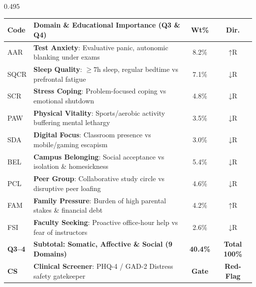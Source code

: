 \documentclass[aspectratio=169, 10pt]{beamer}
\begin{document}
\begin{frame}
\begin{columns}[T]
    \begin{column}{0.495\textwidth}
      \begin{tcolorbox}[colback=white, colframe=BluePrimary, arc=1.5mm, boxrule=0.8pt, top=0.3mm, bottom=0.3mm, left=0.8mm, right=0.8mm]
        \centering\fontsize{4.7pt}{5.6pt}\selectfont
        \renewcommand{\arraystretch}{0.84}
        \begin{tabularx}{\linewidth}{@{}l X c c@{}}
          \toprule
          \textbf{Code} & \textbf{Domain \& Educational Importance (Q3 \& Q4)} & \textbf{Wt\%} & \textbf{Dir.} \\
          \midrule
          \rowcolor{BlueLight} AAR & \textbf{Test Anxiety}: Evaluative panic, autonomic blanking under exams & 8.2\% & $\uparrow\text{R}$ \\
          \rowcolor{BlueLight} SQCR & \textbf{Sleep Quality}: $\ge 7$h sleep, regular bedtime vs prefrontal fatigue & 7.1\% & $\downarrow\text{R}$ \\
          \rowcolor{BlueLight} SCR & \textbf{Stress Coping}: Problem-focused coping vs emotional shutdown & 4.8\% & $\downarrow\text{R}$ \\
          \rowcolor{BlueLight} PAW & \textbf{Physical Vitality}: Sports/aerobic activity buffering mental lethargy & 3.5\% & $\downarrow\text{R}$ \\
          \rowcolor{BlueLight} SDA & \textbf{Digital Focus}: Classroom presence vs mobile/gaming escapism & 3.0\% & $\downarrow\text{R}$ \\
          \midrule
          \rowcolor{CanvasBG} BEL & \textbf{Campus Belonging}: Social acceptance vs isolation \& homesickness & 5.4\% & $\downarrow\text{R}$ \\
          \rowcolor{CanvasBG} PCL & \textbf{Peer Group}: Collaborative study circle vs disruptive peer loafing & 4.6\% & $\downarrow\text{R}$ \\
          \rowcolor{CanvasBG} FAM & \textbf{Family Pressure}: Burden of high parental stakes \& financial debt & 4.2\% & $\uparrow\text{R}$ \\
          \rowcolor{CanvasBG} FSI & \textbf{Faculty Seeking}: Proactive office-hour help vs fear of instructors & 2.6\% & $\downarrow\text{R}$ \\
          \midrule
          \textbf{Q3--4} & \textbf{Subtotal: Somatic, Affective \& Social (9 Domains)} & \textbf{40.4\%} & \textbf{Total 100\%} \\
          \rowcolor{GoldBG} \textbf{CS} & \textbf{Clinical Screener}: PHQ-4 / GAD-2 Distress safety gatekeeper & \textbf{Gate} & \textbf{Red-Flag} \\
          \bottomrule
        \end{tabularx}
      \end{tcolorbox}
    \end{column}
  \end{columns}
  \vspace{-0.25cm}


\end{frame}
\end{document}
